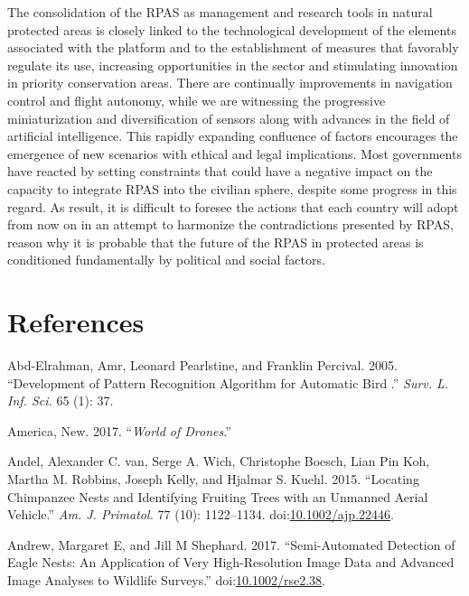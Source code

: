 \documentclass[]{interact}
\theoremstyle{plain}%
\theoremstyle{definition}
\theoremstyle{remark}
\begin{document}
The consolidation of the RPAS as management and research tools in
natural protected areas is closely linked to the technological
development of the elements associated with the platform and to the
establishment of measures that favorably regulate its use, increasing
opportunities in the sector and stimulating innovation in priority
conservation areas. There are continually improvements in navigation
control and flight autonomy, while we are witnessing the progressive
miniaturization and diversification of sensors along with advances in
the field of artificial intelligence. This rapidly expanding confluence
of factors encourages the emergence of new scenarios with ethical and
legal implications. Most governments have reacted by setting constraints
that could have a negative impact on the capacity to integrate RPAS into
the civilian sphere, despite some progress in this regard. As result, it
is difficult to foresee the actions that each country will adopt from
now on in an attempt to harmonize the contradictions presented by RPAS,
reason why it is probable that the future of the RPAS in protected areas
is conditioned fundamentally by political and social factors.

\section*{References}\label{references}

\hypertarget{refs}{}
\hypertarget{ref-abd-elrahman_development_2005}{}
Abd-Elrahman, Amr, Leonard Pearlstine, and Franklin Percival. 2005.
``Development of Pattern Recognition Algorithm for Automatic Bird .''
\emph{Surv. L. Inf. Sci.} 65 (1): 37.

\hypertarget{ref-Bworld_of_drones2017}{}
America, New. 2017. ``\emph{World of Drones}.''

\hypertarget{ref-van_andel_locating_2015}{}
Andel, Alexander C. van, Serge A. Wich, Christophe Boesch, Lian Pin Koh,
Martha M. Robbins, Joseph Kelly, and Hjalmar S. Kuehl. 2015. ``Locating
Chimpanzee Nests and Identifying Fruiting Trees with an Unmanned Aerial
Vehicle.'' \emph{Am. J. Primatol.} 77 (10): 1122--1134.
doi:\href{https://doi.org/10.1002/ajp.22446}{10.1002/ajp.22446}.

\hypertarget{ref-andrew_semi-automated_2017}{}
Andrew, Margaret E, and Jill M Shephard. 2017. ``Semi-Automated
Detection of Eagle Nests: An Application of Very High-Resolution Image
Data and Advanced Image Analyses to Wildlife Surveys.''
doi:\href{https://doi.org/10.1002/rse2.38}{10.1002/rse2.38}.
\end{document}
